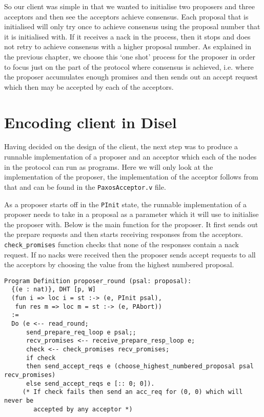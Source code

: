 So our client was simple in that we wanted to initialise two proposers and three
acceptors and then see the acceptors achieve consensus. Each proposal that is initialised
will only try once to achieve consensus using the proposal number that it is initialised
with. If it receives a nack in the process, then it stops and does not retry to
achieve consensus with a higher proposal number. As explained in the previous
chapter, we choose this `one shot' process for the proposer in order to focus
just on the part of the protocol where consensus is achieved, i.e. where the proposer
accumulates enough promises and then sends out an accept request which then may
be accepted by each of the acceptors.

\section{Encoding client in Disel}
Having decided on the design of the client, the next step was to produce a
runnable implementation of a
proposer and an acceptor which each of the nodes in the protocol can run as programs. Here we
will only look at the implementation of the proposer, the implementation of
the acceptor follows from that and can be found in the \texttt{PaxosAcceptor.v} file.

As a proposer starts off in the \texttt{PInit} state, the runnable implementation
of a proposer needs to take in a proposal as a parameter which it will use to
initialise the proposer with. Below is the main function for the proposer.
It first sends out the prepare requests and then starts receiving responses
from the acceptors. \texttt{check\_promises} function checks that none of the
responses contain a nack request. If no nacks were received then the proposer
sends accept requests to all the acceptors by choosing the value from the
highest numbered proposal.

\begin{lstlisting}
Program Definition proposer_round (psal: proposal):
  {(e : nat)}, DHT [p, W]
  (fun i => loc i = st :-> (e, PInit psal),
   fun res m => loc m = st :-> (e, PAbort))
  :=
  Do (e <-- read_round;
      send_prepare_req_loop e psal;;
      recv_promises <-- receive_prepare_resp_loop e;
      check <-- check_promises recv_promises;
      if check
      then send_accept_reqs e (choose_highest_numbered_proposal psal recv_promises)
      else send_accept_reqs e [:: 0; 0]).
     (* If check fails then send an acc_req for (0, 0) which will never be
        accepted by any acceptor *)
\end{lstlisting}

